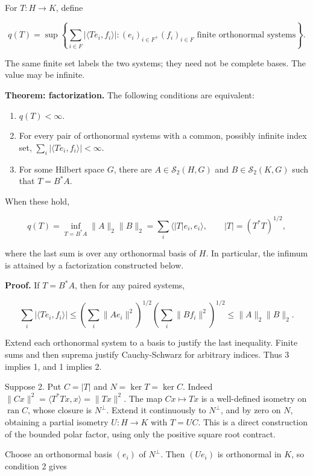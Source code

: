 \documentclass[
  11pt,
]{article}
\providecommand{\tightlist}{%
  \setlength{\itemsep}{0pt}\setlength{\parskip}{0pt}}
\begin{document}
For \(T:H\to K\), define

\[
q(T)=\sup\left\{
\sum_{i\in F}|\langle Te_i,f_i\rangle|:
(e_i)_{i\in F},(f_i)_{i\in F}\text{ finite orthonormal systems}
\right\}.                                                    \tag{T5}
\]

The same finite set labels the two systems; they need not be complete
bases. The value may be infinite.

\textbf{Theorem: factorization.} The following conditions are
equivalent:

\begin{enumerate}
\def\labelenumi{\arabic{enumi}.}
\tightlist
\item
  \(q(T)<\infty\).
\item
  For every pair of orthonormal systems with a common, possibly infinite
  index set, \(\sum_i|\langle Te_i,f_i\rangle|<\infty\).
\item
  For some Hilbert space \(G\), there are \(A\in\mathcal S_2(H,G)\) and
  \(B\in\mathcal S_2(K,G)\) such that \(T=B^*A\).
\end{enumerate}

When these hold,

\[
q(T)=\inf_{T=B^*A}\|A\|_2\|B\|_2
=\sum_i\langle |T|e_i,e_i\rangle,\qquad |T|=(T^*T)^{1/2},     \tag{T6}
\]

where the last sum is over any orthonormal basis of \(H\). In
particular, the infimum is attained by a factorization constructed
below.

\textbf{Proof.} If \(T=B^*A\), then for any paired systems,

\[
\sum_i|\langle Te_i,f_i\rangle|
\leq\left(\sum_i\|Ae_i\|^2\right)^{1/2}
     \left(\sum_i\|Bf_i\|^2\right)^{1/2}
\leq\|A\|_2\|B\|_2.                                        \tag{T7}
\]

Extend each orthonormal system to a basis to justify the last
inequality. Finite sums and then suprema justify Cauchy-Schwarz for
arbitrary indices. Thus 3 implies 1, and 1 implies 2.

Suppose 2. Put \(C=|T|\) and \(N=\ker T=\ker C\). Indeed
\(\|Cx\|^2=\langle T^*Tx,x\rangle=\|Tx\|^2\). The map \(Cx\mapsto Tx\)
is a well-defined isometry on \(\operatorname{ran}C\), whose closure is
\(N^\perp\). Extend it continuously to \(N^\perp\), and by zero on
\(N\), obtaining a partial isometry \(U:H\to K\) with \(T=UC\). This is
a direct construction of the bounded polar factor, using only the
positive square root contract.

Choose an orthonormal basis \((e_i)\) of \(N^\perp\). Then \((Ue_i)\) is
orthonormal in \(K\), so condition 2 gives
\end{document}

